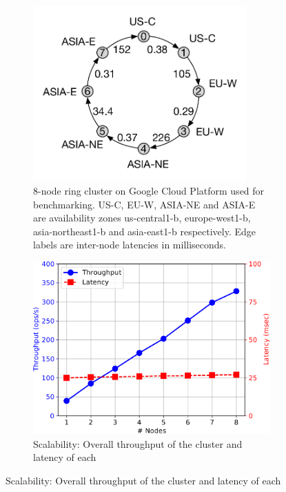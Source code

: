 \begin{figure}[t]
  \centering
	\begin{subfigure}{0.45\textwidth}
		\includegraphics[width=0.9\textwidth]{Figures/cluster.pdf}
		\caption{8-node ring cluster on Google Cloud Platform used for
			benchmarking. US-C, EU-W, ASIA-NE and ASIA-E are availability zones
			us-central1-b, europe-west1-b, asia-northeast1-b and asia-east1-b
			respectively. Edge labels are inter-node latencies in milliseconds.}
		\label{fig:cluster}
	\end{subfigure}
	\hfill
	\begin{subfigure}{0.45\textwidth}
		\includegraphics[width=\textwidth]{Graphs/scalability.pdf}
		\caption{Scalability: Overall throughput of the cluster and latency of each
}
\end{subfigure}
\end{figure}
